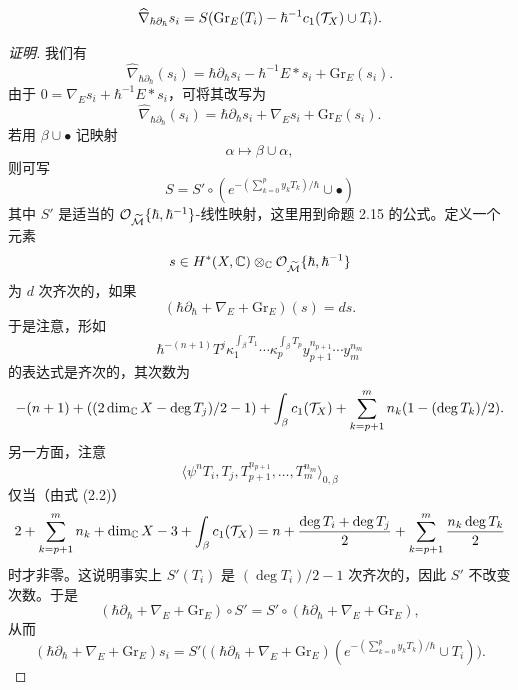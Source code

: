 \begin{proposition}
\[
\widehat{\nabla}_{\hbar\partial_\hbar}s_i=S(\mathrm{Gr}_E(T_i)-\hbar^{-1}c_1(\mathcal{T}_X)\cup T_i).
\]
\end{proposition}

\begin{proof}[证明]
我们有
\[
\widehat{\nabla}_{\hbar\partial_\hbar}(s_i)=\hbar\partial_\hbar s_i-\hbar^{-1}E*s_i+\mathrm{Gr}_E(s_i).
\]
由于 $0=\nabla_E s_i+\hbar^{-1}E*s_i$，可将其改写为
\[
\widehat{\nabla}_{\hbar\partial_\hbar}(s_i)=\hbar\partial_\hbar s_i+\nabla_E s_i+\mathrm{Gr}_E(s_i).
\]
若用 $\beta\cup\bullet$ 记映射
\[
\alpha\mapsto\beta\cup\alpha,
\]
则可写
\[
S=S'\circ(e^{-(\sum_{k=0}^p y_kT_k)/\hbar}\cup\bullet)
\]
其中 $S'$ 是适当的 $\mathcal{O}_{\widetilde{\mathcal{M}}}\{\hbar,\hbar^{-1}\}$-线性映射，这里用到命题 2.15 的公式。定义一个元素
\[
s\in H^*(X,\mathbb{C})\otimes_{\mathbb{C}}\mathcal{O}_{\widetilde{\mathcal{M}}}\{\hbar,\hbar^{-1}\}
\]
为 $d$ 次齐次的，如果
\[
(\hbar\partial_\hbar+\nabla_E+\mathrm{Gr}_E)(s)=ds.
\]
于是注意，形如
\[
\hbar^{-(n+1)}T^j\kappa_1^{\int_\beta T_1}\cdots\kappa_p^{\int_\beta T_p}y_{p+1}^{n_{p+1}}\cdots y_m^{n_m}
\]
的表达式是齐次的，其次数为
\[
-(n+1)+((2\dim_{\mathbb{C}} X-\deg T_j)/2-1)+\int_\beta c_1(\mathcal{T}_X)+\sum_{k=p+1}^m n_k(1-(\deg T_k)/2).
\]
另一方面，注意
\[
\langle\psi^nT_i,T_j,T_{p+1}^{n_{p+1}},\dots,T_m^{n_m}\rangle_{0,\beta}
\]
仅当（由式 (2.2)）
\[
2+\sum_{k=p+1}^m n_k+\dim_{\mathbb{C}} X-3+\int_\beta c_1(\mathcal{T}_X)=n+\frac{\deg T_i+\deg T_j}{2}+\sum_{k=p+1}^m\frac{n_k\deg T_k}{2}
\]
时才非零。这说明事实上 $S'(T_i)$ 是 $(\deg T_i)/2-1$ 次齐次的，因此 $S'$ 不改变次数。于是
\[
(\hbar\partial_\hbar+\nabla_E+\mathrm{Gr}_E)\circ S'=S'\circ(\hbar\partial_\hbar+\nabla_E+\mathrm{Gr}_E),
\]
从而
\[
(\hbar\partial_\hbar+\nabla_E+\mathrm{Gr}_E)s_i=S'\big((\hbar\partial_\hbar+\nabla_E+\mathrm{Gr}_E)(e^{-(\sum_{k=0}^p y_kT_k)/\hbar}\cup T_i)\big).
\]


\end{proof}
